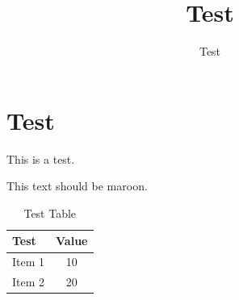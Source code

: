 \documentclass[oneside]{um}
\begin{document}
\frontmatter
\title{Test}
\author{Test}
\maketitle

\mainmatter

\chapter{Test}

This is a test.

{\color{maroon}
This text should be maroon.
}

\begin{table}[h]
\centering
\caption{Test Table}
{\color{maroon}
\begin{tabular}{lc}
\toprule
Test & Value \\
\midrule
Item 1 & 10 \\
Item 2 & 20 \\
\bottomrule
\end{tabular}
}
\end{table}
\end{document}
